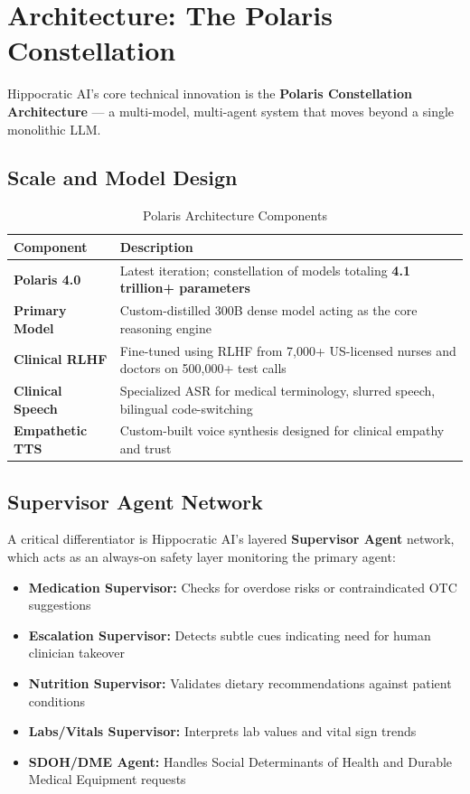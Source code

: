 \documentclass[12pt,a4paper]{article}
\begin{document}
\newpage

\section{Architecture: The Polaris Constellation}

Hippocratic AI's core technical innovation is the \textbf{Polaris Constellation Architecture} --- a multi-model, multi-agent system that moves beyond a single monolithic LLM.

\subsection{Scale and Model Design}

\begin{table}[H]
\centering
\renewcommand{\arraystretch}{1.4}
\begin{tabularx}{\textwidth}{lX}
\toprule
\textbf{Component} & \textbf{Description} \\
\midrule
\textbf{Polaris 4.0} & Latest iteration; constellation of models totaling \textbf{4.1 trillion+ parameters} \\
\textbf{Primary Model} & Custom-distilled 300B dense model acting as the core reasoning engine \\
\textbf{Clinical RLHF} & Fine-tuned using RLHF from 7,000+ US-licensed nurses and doctors on 500,000+ test calls \\
\textbf{Clinical Speech} & Specialized ASR for medical terminology, slurred speech, bilingual code-switching \\
\textbf{Empathetic TTS} & Custom-built voice synthesis designed for clinical empathy and trust \\
\bottomrule
\end{tabularx}
\caption{Polaris Architecture Components}
\end{table}

\subsection{Supervisor Agent Network}

A critical differentiator is Hippocratic AI's layered \textbf{Supervisor Agent} network, which acts as an always-on safety layer monitoring the primary agent:

\begin{itemize}[noitemsep]
    \item \textbf{Medication Supervisor:} Checks for overdose risks or contraindicated OTC suggestions
    \item \textbf{Escalation Supervisor:} Detects subtle cues indicating need for human clinician takeover
    \item \textbf{Nutrition Supervisor:} Validates dietary recommendations against patient conditions
    \item \textbf{Labs/Vitals Supervisor:} Interprets lab values and vital sign trends
    \item \textbf{SDOH/DME Agent:} Handles Social Determinants of Health and Durable Medical Equipment requests
\end{itemize}
\end{document}
